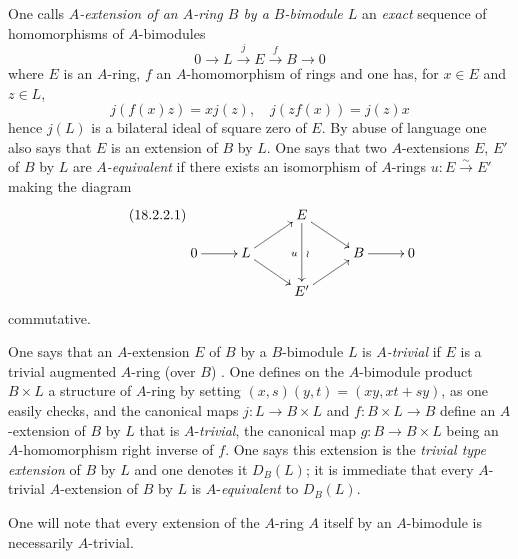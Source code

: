 \begin{env}[18.2.2]
\label{0.18.2.2}
One calls \emph{$A$-extension of an $A$-ring $B$ by a $B$-bimodule $L$} an \emph{exact} sequence of homomorphisms of $A$-bimodules
\[
  0\to L\xrightarrow{j} E\xrightarrow{f} B\to 0
\]
where $E$ is an $A$-ring, $f$ an $A$-homomorphism of rings and one has, for $x\in E$ and $z\in L$,
\[
  j(f(x)z)=xj(z),\quad j(zf(x))=j(z)x
\]
hence  $j(L)$ is a bilateral ideal of square zero of $E$.
By abuse of language one also says that $E$ is an extension of $B$ by $L$.
One says that two $A$-extensions $E$, $E'$ of $B$ by $L$ are \emph{$A$-equivalent} if there exists an isomorphism of $A$-rings $u:E\xrightarrow{\sim} E'$ making the diagram
\begin{equation}
\tag{18.2.2.1}
  \label{0.18.2.2.1}
  \xymatrix@C=2.1pc@R=1.2pc{
    & & E\ar[dr]\ar[dd]_u^{\wr} & & \\
    0\ar[r] & L\ar[ur]\ar[dr] & & B\ar[r] & 0\\
    & & E'\ar[ur] & &
  }
\end{equation}
commutative.
\end{env}

\begin{env}[18.2.3]
\label{0.18.2.3}
One says that an $A$-extension $E$ of $B$ by a $B$-bimodule $L$ is \emph{$A$-trivial} if $E$ is a trivial augmented $A$-ring (over $B$) .
One defines on the $A$-bimodule product $B\times L$ a structure of $A$-ring by setting $(x,s)(y,t)=(xy,xt+sy)$, as one easily checks, and the canonical maps $j:L\to B\times L$ and $f:B\times L\to B$ define an $A$-extension of $B$ by $L$ that is $A$-\emph{trivial}, the canonical map $g:B\to B\times L$ being an $A$-homomorphism right inverse of $f$.
One says this extension is the \emph{trivial type extension} of $B$ by $L$ and one denotes it $D_B(L)$; it is immediate that every $A$-trivial $A$-extension of $B$ by $L$ is $A$-\emph{equivalent} to $D_B(L)$.

One will note that every extension of the $A$-ring $A$ itself by an $A$-bimodule is necessarily $A$-trivial.
\end{env}

